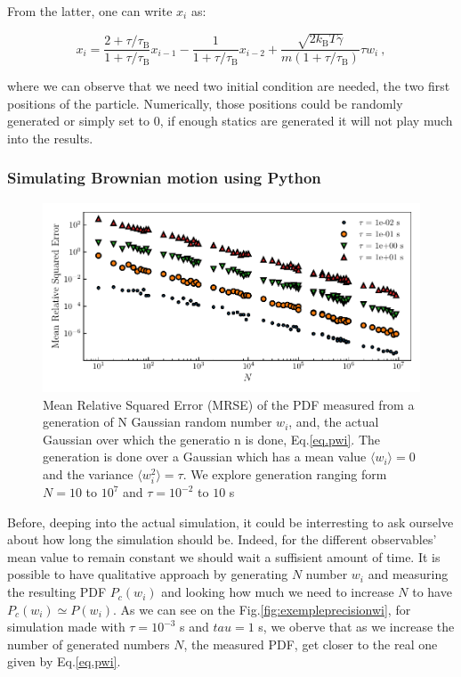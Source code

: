From the latter, one can write $x_i$ as:

\begin{equation}	
	x_i = \frac{2 + \tau /\tau_\mathrm{B}}{1 + \tau / \tau_\mathrm{B} } x_{i-1} 
	- \frac{1}{1 + \tau / \tau_\mathrm{B}}x_{i-2}
	+ \frac{\sqrt{2k_\mathrm{B}T\gamma}}{m(1 + \tau/\tau_\mathrm{B})} \tau w_i ~,
\end{equation}

where we can observe that we need two initial condition are needed, the two first positions of  the particle. Numerically, those positions could be randomly generated or simply set to $0$, if enough statics are generated it will not play much into the results.

\subsubsection{Simulating Brownian motion using Python}

\begin{figure}[h]
	\centering
	\includegraphics{02_body/chapter1/image/noise_simulation/MSE.pdf}
	\caption{Mean Relative Squared Error (\gls{MRSE}) of the \gls{PDF} measured from a generation of N Gaussian random number $w_i$, and, the actual Gaussian over which the generatio n is done, Eq.\ref{eq.pwi}. The generation is done over a Gaussian which has a mean value $\langle w_i \rangle =0$ and the variance $\langle w_i^2 \rangle = \tau$. We explore generation ranging form $N = 10$ to $10^7$ and $\tau = 10^{-2}$ to $10$ s}  
	\label{fig:MSEwi}
\end{figure}

Before, deeping into the actual simulation, it could be interresting to ask ourselve about how long the simulation should be. Indeed, for the different observables' mean value to remain constant we should wait a suffisient amount of time. It is possible to have qualitative approach by generating $N$ number $w_i$ and measuring the resulting \gls{PDF} $P_c(w_i)$ and looking how much we need to increase $N$ to have $P_c(w_i) \simeq P(w_i)$. As we can see on the Fig.\ref{fig:exempleprecisionwi}, for simulation made with $\tau = 10^{-3}$ s and $tau = 1$ s, we oberve that as we increase the number of generated numbers $N$, the measured PDF, get closer to the real one given by Eq.\ref{eq.pwi}. 




